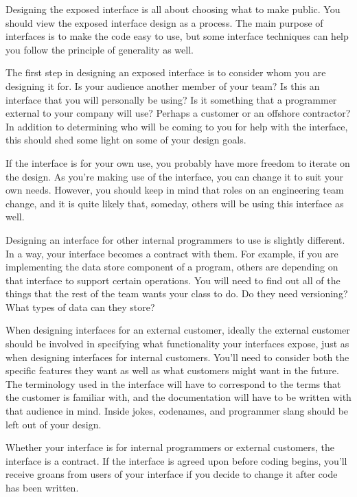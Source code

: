 Designing the exposed interface is all about choosing what to make public. You should view the exposed interface design as a process. The main purpose of interfaces is to make the code easy to use, but some interface techniques can help you follow the principle of generality as well.


The first step in designing an exposed interface is to consider whom you are designing it for. Is your audience another member of your team? Is this an interface that you will personally be using? Is it something that a programmer external to your company will use? Perhaps a customer or an offshore contractor? In addition to determining who will be coming to you for help with the interface, this should shed some light on some of your design goals.

If the interface is for your own use, you probably have more freedom to iterate on the design. As you’re making use of the interface, you can change it to suit your own needs. However, you should keep in mind that roles on an engineering team change, and it is quite likely that, someday, others will be using this interface as well.

Designing an interface for other internal programmers to use is slightly different. In a way, your interface becomes a contract with them. For example, if you are implementing the data store component of a program, others are depending on that interface to support certain operations. You will need to find out all of the things that the rest of the team wants your class to do. Do they need versioning? What types of data can they store?

When designing interfaces for an external customer, ideally the external customer should be involved in specifying what functionality your interfaces expose, just as when designing interfaces for internal customers. You’ll need to consider both the specific features they want as well as what customers might want in the future. The terminology used in the interface will have to correspond to the terms that the customer is familiar with, and the documentation will have to be written with that audience in mind. Inside jokes, codenames, and programmer slang should be left out of your design.

Whether your interface is for internal programmers or external customers, the interface is a contract. If the interface is agreed upon before coding begins, you’ll receive groans from users of your interface if you decide to change it after code has been written.

